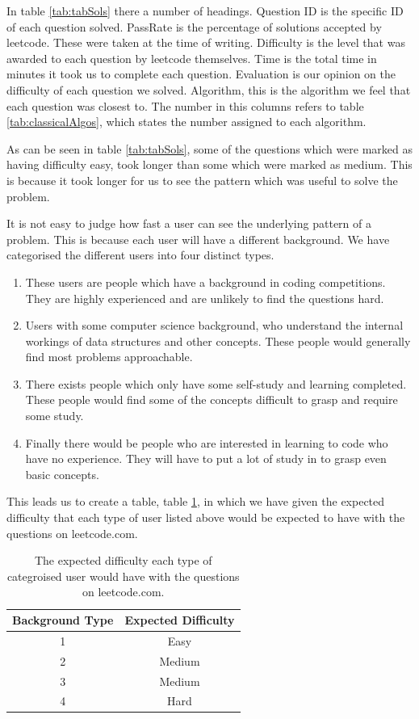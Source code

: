\documentclass[10pt,twocolumn]{IEEEtran}
\begin{document}
\par In table \ref{tab:tabSols} there a number of headings. Question ID is the specific ID of each question solved. PassRate is the percentage of solutions accepted by leetcode. These were taken at the time of writing. Difficulty is the level that was awarded to each question by leetcode themselves. Time is the total time in minutes it took us to complete each question. Evaluation is our opinion on the difficulty of each question we solved. Algorithm, this is the algorithm we feel that each question was closest to. The number in this columns refers to table \ref{tab:classicalAlgos}, which states the number assigned to each algorithm.

\par As can be seen in table \ref{tab:tabSols}, some of the questions which were marked as having difficulty easy, took longer than some which were marked as medium. This is because it took longer for us to see the pattern which was useful to solve the problem.
\par It is not easy to judge how fast a user can see the underlying pattern of a problem. This is because each user will have a different background. We have categorised the different users into four distinct types. 
\begin{enumerate}
\item{These users are people which have a background in coding competitions. They are highly experienced and are unlikely to find the questions hard.}
\item{Users with some computer science background, who understand the internal workings of data structures and other concepts. These people would generally find most problems approachable.}
\item{There exists people which only have some self-study and learning completed. These people would find some of the concepts difficult to grasp and require some study.}
\item{Finally there would be people who are interested in learning to code who have no experience. They will have to put a lot of study in to grasp even basic concepts.}
\end{enumerate}
This leads us to create a table, table \ref{tab:difficulty}, in which we have given the expected difficulty that each type of user listed above would be expected to have with the questions on leetcode.com.
\begin{table}[t]
\centering
	\begin{tabular}{| c | c |} \hline
		   Background Type &Expected Difficulty \\ \hline
		1 & Easy \\ \hline
		2 & Medium \\ \hline
		3 & Medium  \\ \hline
		4 & Hard  \\ \hline
	\end{tabular}
	\caption{The expected difficulty each type of categroised user would have with the questions on leetcode.com.}
	\label{tab:difficulty}
\end{table}
\end{document}
